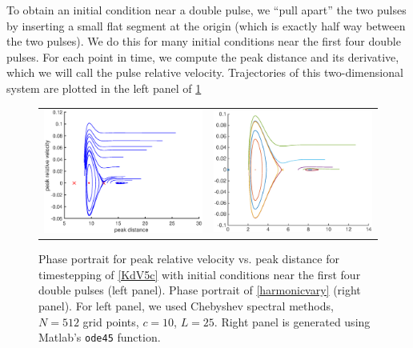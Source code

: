 \documentclass[thesis.tex]{subfiles}
\begin{document}
To obtain an initial condition near a double pulse, we ``pull apart'' the two pulses by inserting a small flat segment at the origin (which is exactly half way between the two pulses). We do this for many initial conditions near the first four double pulses. For each point in time, we compute the peak distance and its derivative, which we will call the pulse relative velocity. Trajectories of this two-dimensional system are plotted in the left panel of \cref{fig:KdV5timestep}

\begin{figure}
\begin{center}
\begin{tabular}{cc}
\includegraphics[width=8cm]{images/kdv5numerics/phaseportrait} &
\includegraphics[width=8cm]{images/kdv5numerics/simplephaseportrait} \\
\end{tabular}
\caption{Phase portrait for peak relative velocity vs. peak distance for timestepping of \cref{KdV5c} with initial conditions near the first four double pulses (left panel). Phase portrait of \cref{harmonicvary} (right panel). For left panel, we used Chebyshev spectral methods, $N = 512$ grid points, $c = 10$, $L = 25$. Right panel is generated using Matlab's \texttt{ode45} function.
}
\label{fig:KdV5timestep}
\end{center}
\end{figure}
\end{document}

